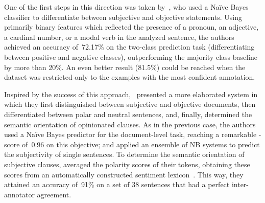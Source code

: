 One of the first steps in this direction was taken by~\citet{Wiebe:99},
who used a Na{\"i}ve Bayes classifier to differentiate between
subjective and objective statements.  Using primarily binary features
which reflected the presence of a pronoun, an adjective, a cardinal
number, or a modal verb in the analyzed sentence, the authors achieved
an accuracy of~72.17\% on the two-class prediction task
(differentiating between positive and negative classes), outperforming
the majority class baseline by more than 20\%.  An even better result
(81.5\%) could be reached when the dataset was restricted only to the
examples with the most confident annotation.

Inspired by the success of this approach,~\citet{Yu:03} presented a
more elaborated system in which they first distinguished between
subjective and objective documents, then differentiated between polar
and neutral sentences, and, finally, determined the semantic
orientation of opinionated clauses.  As in the previous case, the
authors used a Na{\"i}ve Bayes predictor for the document-level task,
reaching a remarkable \F-score of~0.96 on this objective; and applied
an ensemble of NB systems to predict the subjectivity of single
sentences.  To determine the semantic orientation of subjective
clauses, \citeauthor{Yu:03} averaged the polarity scores of their
tokens, obtaining these scores from an automatically constructed
sentiment lexicon~\cite{Hatzivassi:97}.  This way, they attained an
accuracy of~91\% on a set of 38 sentences that had a perfect
inter-annotator agreement.


